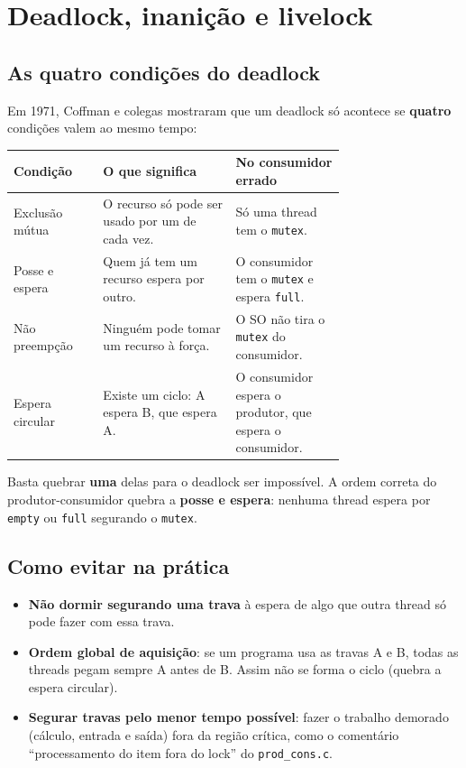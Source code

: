 \documentclass[11pt,a4paper]{article}
\newcommand{\cmd}[1]{\texttt{#1}}
\begin{document}
\section{Deadlock, inanição e livelock}

\subsection{As quatro condições do deadlock}

Em 1971, Coffman e colegas mostraram que um deadlock só acontece se \textbf{quatro} condições valem ao mesmo tempo:

\begin{center}
\begin{tabular}{@{}lR{0.4\linewidth}R{0.33\linewidth}@{}}
\toprule
\textbf{Condição} & \textbf{O que significa} & \textbf{No consumidor errado} \\
\midrule
Exclusão mútua & O recurso só pode ser usado por um de cada vez. & Só uma thread tem o \cmd{mutex}. \\
Posse e espera & Quem já tem um recurso espera por outro. & O consumidor tem o \cmd{mutex} e espera \cmd{full}. \\
Não preempção & Ninguém pode tomar um recurso à força. & O SO não tira o \cmd{mutex} do consumidor. \\
Espera circular & Existe um ciclo: A espera B, que espera A. & O consumidor espera o produtor, que espera o consumidor. \\
\bottomrule
\end{tabular}
\end{center}

Basta quebrar \textbf{uma} delas para o deadlock ser impossível. A ordem correta do produtor-consumidor quebra a \textbf{posse e espera}: nenhuma thread espera por \cmd{empty} ou \cmd{full} segurando o \cmd{mutex}.

\subsection{Como evitar na prática}

\begin{itemize}
    \item \textbf{Não dormir segurando uma trava} à espera de algo que outra thread só pode fazer com essa trava.
    \item \textbf{Ordem global de aquisição}: se um programa usa as travas A e B, todas as threads pegam sempre A antes de B. Assim não se forma o ciclo (quebra a espera circular).
    \item \textbf{Segurar travas pelo menor tempo possível}: fazer o trabalho demorado (cálculo, entrada e saída) fora da região crítica, como o comentário ``processamento do item fora do lock'' do \cmd{prod\_cons.c}.
\end{itemize}
\end{document}
